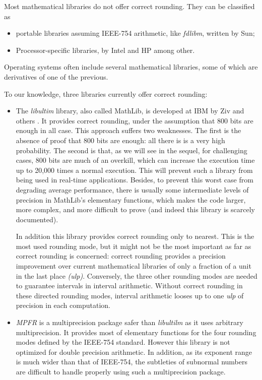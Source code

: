 Most mathematical libraries do not offer correct rounding. They can be classified as 
\begin{itemize}
\item portable libraries  assuming IEEE-754
  arithmetic, like \emph{fdlibm}, written by Sun\cite{FDLIBMweb};
\item  Processor-specific libraries, by
  Intel\cite{HarKubStoTan99,IntelOpenSource} and
  HP\cite{Markstein2000,Markstein2001} among other.
\end{itemize}

Operating systems often include several mathematical libraries, some of which are derivatives of one
of the previous.

To our knowledge, three libraries currently offer correct rounding:
\begin{itemize}
\item The \emph{libultim} library, also called MathLib, is developed
  at IBM by Ziv and others \cite{IBMlibultimweb}. It provides correct
  rounding, under the assumption that 800 bits are enough in all case.
  This approach suffers two weaknesses. The first is the absence of
  proof that 800 bits are enough: all there is is a very high
  probability.  The second is that, as we will see in the sequel, for
  challenging cases, 800 bits are much of an overkill, which can
  increase the execution time up to 20,000 times a normal execution.
  This will prevent such a library from being used in real-time
  applications.  Besides, to prevent this worst case from degrading
  average performance, there is usually some intermediate levels of
  precision in MathLib's elementary functions, which makes the code
  larger, more complex, and more difficult to prove (and indeed this
  library is scarcely documented).
  
  In addition this library provides correct rounding only to nearest.
  This is the most used rounding mode, but it might not be the most
  important as far as correct rounding is concerned: correct rounding
  provides a precision improvement over current mathematical libraries
  of only a fraction of a {unit in the last place} \emph{(ulp)}.
  Conversely, the three other rounding modes are needed to guarantee
  intervals in interval arithmetic.  Without correct rounding in these
  directed rounding modes, interval arithmetic looses up to one
  \emph{ulp} of precision in each computation.
  
\item \emph{MPFR} is a multiprecision package safer than
  \emph{libultilm} as it uses arbitrary multiprecision. It provides
  most of elementary functions for the four rounding modes defined by
  the IEEE-754 standard. However this library is not optimized for
  double precision arithmetic. In addition, as its exponent range is
  much wider than that of IEEE-754, the subtleties of subnormal numbers
  are difficult to handle properly using such a multiprecision
  package.


\end{itemize}
